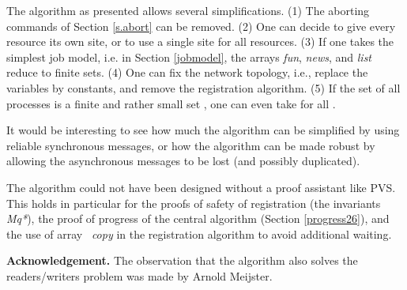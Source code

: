 \documentclass[10pt]{article} \usepackage[english]{babel}
\def\S #1/{\mbox {\textsl{#1}}}
\def\B #1/{\mbox {\textbf{#1}}}
\def\sbreak {\smallbreak\noindent}
\begin{document}
The algorithm as presented allows several simplifications.  (1) The
aborting commands of Section \ref{s.abort} can be removed.  (2) One
can decide to give every resource its own site, or to use a single
site for all resources.  (3) If one takes the simplest job model,
i.e.  in Section \ref{jobmodel}, the arrays \S fun/, \S news/,
and \S list/ reduce to finite sets.  (4) One can fix the network
topology, i.e., replace the variables  by constants, and
remove the registration algorithm.  (5) If the set of all processes is
a finite and rather small set , one can even take  for all .

It would be interesting to see how much the algorithm can be
simplified by using reliable synchronous messages, or how the
algorithm can be made robust by allowing the asynchronous messages to
be lost (and possibly duplicated).

The algorithm could not have been designed without a proof assistant
like PVS.  This holds in particular for the proofs of safety of
registration (the invariants \S Mq*/), the proof of progress of the
central algorithm (Section \ref{progress26}), and the use of array \S
copy/ in the registration algorithm to avoid additional waiting.

\sbreak \B Acknowledgement./ The observation that the algorithm also
solves the readers/writers problem was made by Arnold Meijster.

 
\end{document}
